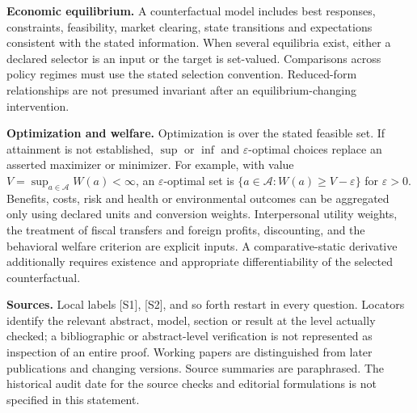\documentclass[11pt,a4paper]{article}
\begin{document}
\textbf{Economic equilibrium.} A counterfactual model includes best responses, constraints, feasibility, market clearing, state transitions and expectations consistent with the stated information. When several equilibria exist, either a declared selector is an input or the target is set-valued. Comparisons across policy regimes must use the stated selection convention. Reduced-form relationships are not presumed invariant after an equilibrium-changing intervention.

\textbf{Optimization and welfare.} Optimization is over the stated feasible set. If attainment is not established, $\sup$ or $\inf$ and $\varepsilon$-optimal choices replace an asserted maximizer or minimizer. For example, with value $V=\sup_{a\in\mathcal A}W(a)<\infty$, an $\varepsilon$-optimal set is $\{a\in\mathcal A:W(a)\geq V-\varepsilon\}$ for $\varepsilon>0$. Benefits, costs, risk and health or environmental outcomes can be aggregated only using declared units and conversion weights. Interpersonal utility weights, the treatment of fiscal transfers and foreign profits, discounting, and the behavioral welfare criterion are explicit inputs. A comparative-static derivative additionally requires existence and appropriate differentiability of the selected counterfactual.

\textbf{Sources.} Local labels [S1], [S2], and so forth restart in every question. Locators identify the relevant abstract, model, section or result at the level actually checked; a bibliographic or abstract-level verification is not represented as inspection of an entire proof. Working papers are distinguished from later publications and changing versions. Source summaries are paraphrased. The historical audit date for the source checks and editorial formulations is not specified in this statement.
\end{document}
